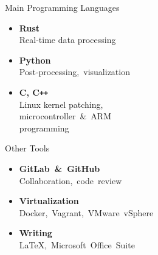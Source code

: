 {%
\begin{tcbraster}[raster columns=2, raster equal height, raster width=\textwidth, raster left skip=-5mm, raster right skip=-15mm]
  \begin{tcolorbox}[colback=white, boxrule=0pt, frame empty, nobeforeafter]
    {\color{textgray} Main Programming Languages }\\
    \vspace{-3mm}
    \begin{itemize}[left=0mm]
      \item \textbf{Rust}\\
        Real-time data processing
      \item \textbf{Python}\\
        Post-processing,\ visualization
      \item \textbf{C, C\texttt{++}}\\
        Linux kernel patching,\\microcontroller\ \&\ ARM\\ programming
    \end{itemize}
  \end{tcolorbox}
  \hspace{-10mm}
  \begin{tcolorbox}[colback=white, boxrule=0pt, frame empty, nobeforeafter]
    {\color{textgray} Other Tools }\\
    \vspace{-3mm}
    \begin{itemize}[left=0mm]
      \item \textbf{GitLab~\&~GitHub}\\
        Collaboration,~code~review%
      \item \textbf{Virtualization}\\
        Docker,~Vagrant,~VMware~vSphere
      \item \textbf{Writing}\\
        LaTeX,~Microsoft~Office~Suite
    \end{itemize}
  \end{tcolorbox}
\end{tcbraster}

}

\newcommand{\CVSign}{
\begin{flushright}
    Munich, 08.07.2024\\
    \vspace{10mm}
    Bastian Schmidt
\end{flushright}
}

